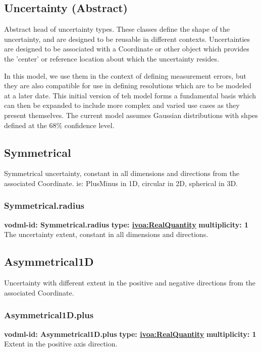   \subsection{Uncertainty (Abstract)}
  \label{sect:Uncertainty}
    Abstract head of uncertainty types. These classes define the shape of the uncertainty, and are designed to be reusable in different contexts. Uncertainties are designed to be associated with a Coordinate or other object which provides the 'center' or reference location about which the uncertainty resides. 

In this model, we use them in the context of defining measurement errors, but they are also compatible for use in defining resolutions which are to be modeled at a later date. This initial version of teh model forms a fundamental basis which can then be expanded to include more complex and varied use cases as they present themselves. The current model assumes Gaussian distributions with shpes defined at the 68\% confidence level.

  \subsection{Symmetrical}
  \label{sect:Symmetrical}
    Symmetrical uncertainty, constant in all dimensions and directions from the associated Coordinate. ie: PlusMinus in 1D, circular in 2D, spherical in 3D.

    \subsubsection{Symmetrical.radius}
      \textbf{vodml-id: Symmetrical.radius} \newline
      \textbf{type: \hyperref[sect:ivoa]{ivoa:RealQuantity}} \newline
      \textbf{multiplicity: 1} \newline 
      The uncertainty extent, constant in all dimensions and directions.

  \subsection{Asymmetrical1D}
  \label{sect:Asymmetrical1D}
    Uncertainty with different extent in the positive and negative directions from the associated Coordinate.

    \subsubsection{Asymmetrical1D.plus}
      \textbf{vodml-id: Asymmetrical1D.plus} \newline
      \textbf{type: \hyperref[sect:ivoa]{ivoa:RealQuantity}} \newline
      \textbf{multiplicity: 1} \newline 
      Extent in the positive axis direction.

